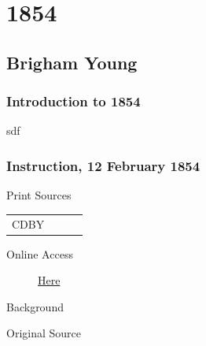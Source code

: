 \section{1854}

	\subsection{Brigham Young}
		\label{EMS-1854-BY}

		\subsubsection{Introduction to 1854}
		
			sdf
			
		\subsubsection{Instruction, 12 February 1854}
			\label{EMS-1854-BY-12-FEB-1854}
			
			\begin{description}
					\item[Print Sources]
				\end{description}

					\begin{tabular}{p{0.5in}p{1in}p{0.5in}p{1in}}
					CDBY	& 		&  		&  \\
					\end{tabular}
				
				\begin{description}
					\item[Online Access] \href{https://catalog.churchofjesuschrist.org/assets/1e4f947a-0644-47b0-b058-5dd134a82a00/0/0}{Here}
				\end{description}
				
				\begin{description}
					\item[Background]
				\end{description}
				
					\phantom{.}
				
				\begin{description}
					\item[Original Source]
				\end{description}
				
